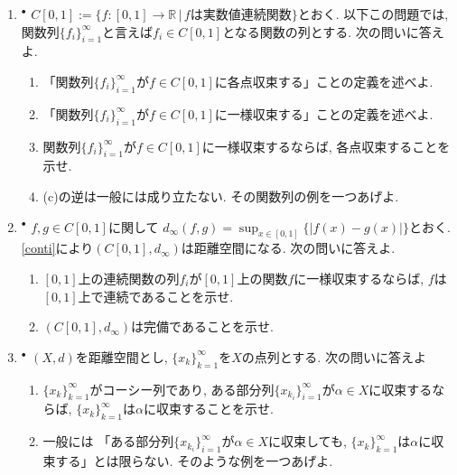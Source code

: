 \documentclass[dvipdfmx,a4paper,11pt]{article}
\newcommand{\R}{\mathbb{R}}
\theoremstyle{definition}
\begin{document}
\begin{enumerate}[label=\textbf{問}\ref*{sec-completion}.\arabic*]
	\setlength{\parskip}{0cm} 
  \setlength{\itemsep}{7pt} 


\item \label{uniform} $^{\bullet}$  $C[0,1] := \{ f : [0,1] \rightarrow \R \,|\, \text{$f$は実数値連続関数}\}$とおく. 以下この問題では, 関数列$\{ f_{i}\}_{i=1}^{\infty}$と言えば$f_i \in C[0,1]$となる関数の列とする. 次の問いに答えよ.
\begin{enumerate}
\setlength{\parskip}{0cm}
  \setlength{\itemsep}{0pt} 
\item 「関数列$\{ f_{i}\}_{i=1}^{\infty}$が$f \in C[0,1]$に各点収束する」ことの定義を述べよ.
\item 「関数列$\{ f_{i}\}_{i=1}^{\infty}$が$f \in C[0,1]$に一様収束する」ことの定義を述べよ. 
\item 関数列$\{ f_{i}\}_{i=1}^{\infty}$が$f \in C[0,1]$に一様収束するならば, 各点収束することを示せ. 
\item (c)の逆は一般には成り立たない. その関数列の例を一つあげよ.
\end{enumerate}

\item $^{\bullet}$  \label{uniform_2}$f,g \in C[0,1]$に関して
$
d_{\infty}(f,g)=\sup_{x \in [0,1] }\{ |f(x) - g(x)|\}
$とおく.
\ref{conti}により$(C[0,1], d_{\infty})$は距離空間になる. 
次の問いに答えよ.
\begin{enumerate}
\setlength{\parskip}{0cm}
  \setlength{\itemsep}{0pt} 
  \item $[0,1]$上の連続関数の列$f_{i}$が$[0,1]$上の関数$f$に一様収束するならば, $f$は$[0,1]$上で連続であることを示せ. 
\item $(C[0,1], d_{\infty})$は完備であることを示せ.
\end{enumerate}

\item $^{\bullet}$  $(X,d)$を距離空間とし, $\{ x_{k}\}_{k=1}^{\infty}$を$X$の点列とする. 次の問いに答えよ
\begin{enumerate}
\setlength{\parskip}{0cm}
  \setlength{\itemsep}{0pt} 
 \item $\{ x_{k}\}_{k=1}^{\infty}$がコーシー列であり, ある部分列$\{ x_{k_{i}}\}_{i=1}^{\infty}$が$\alpha \in X$に収束するならば, $\{ x_{k}\}_{k=1}^{\infty}$は$\alpha$に収束することを示せ.
 \item 一般には 「ある部分列$\{ x_{k_{i}}\}_{i=1}^{\infty}$が$\alpha \in X$に収束しても, $\{ x_{k}\}_{k=1}^{\infty}$は$\alpha$に収束する」とは限らない. そのような例を一つあげよ. 
  \end{enumerate}


\end{enumerate}
\end{document}
